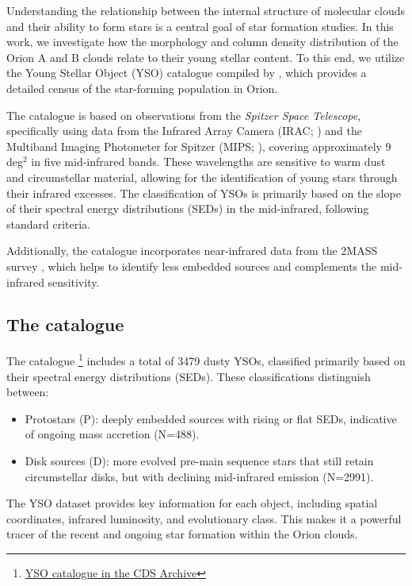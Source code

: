 Understanding the relationship between the internal structure of molecular clouds and their ability to form stars is a central goal of star formation studies. In this work, we investigate how the morphology and column density distribution of the Orion A and B clouds relate to their young stellar content. To this end, we utilize the Young Stellar Object (YSO) catalogue compiled by \cite{megeath2012catalogue}, which provides a detailed census of the star-forming population in Orion.

The catalogue is based on observations from the \textit{Spitzer Space Telescope}, specifically using data from the Infrared Array Camera (IRAC; \cite{fazio2004IRAC}) and the Multiband Imaging Photometer for Spitzer (MIPS; \cite{rieke2004MIPS}), covering approximately 9 deg$^2$ in five mid-infrared bands. These wavelengths are sensitive to warm dust and circumstellar material, allowing for the identification of young stars through their infrared excesses. The classification of YSOs is primarily based on the slope of their spectral energy distributions (SEDs) in the mid-infrared, following standard criteria.

Additionally, the catalogue incorporates near-infrared data from the 2MASS survey \cite{skrutskie2006two}, which helps to identify less embedded sources and complements the mid-infrared sensitivity.

\subsection{The catalogue}
The catalogue \footnote{\href{http://cdsarc.cds.unistra.fr}{YSO catalogue in the CDS Archive}} includes a total of 3479 dusty YSOs, classified primarily based on their spectral energy distributions (SEDs). These classifications distinguish between:
\begin{itemize}
    \item Protostars (P): deeply embedded sources with rising or flat SEDs, indicative of ongoing mass accretion (N=488).
    \item Disk sources (D): more evolved pre-main sequence stars that still retain circumstellar disks, but with declining mid-infrared emission (N=2991).
\end{itemize}

The YSO dataset provides key information for each object, including spatial coordinates, infrared luminosity, and evolutionary class. This makes it a powerful tracer of the recent and ongoing star formation within the Orion clouds.

